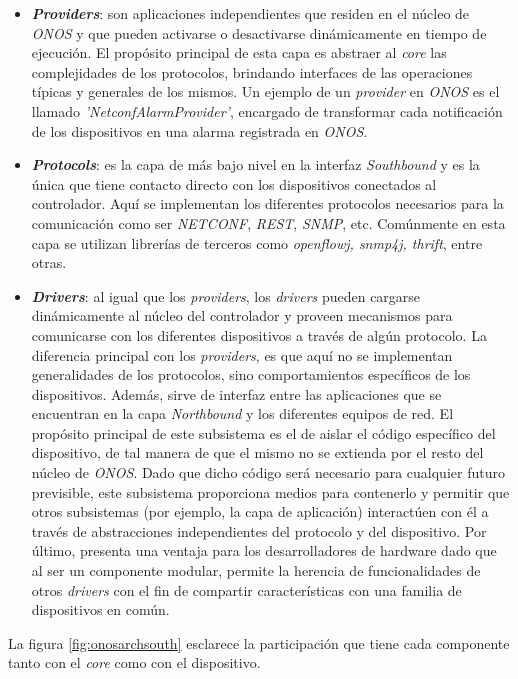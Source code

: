   \begin{itemize}
	\item \textbf{\textit{Providers}}: son aplicaciones independientes que residen en el núcleo de \textit{ONOS} y que pueden activarse o desactivarse dinámicamente en tiempo de ejecución. El propósito principal de esta capa es abstraer al \textit{core} las complejidades de los protocolos, brindando interfaces de las operaciones típicas y generales de los mismos. Un ejemplo de un \textit{provider} en \textit{ONOS} es el llamado \textit{'NetconfAlarmProvider'}, encargado de transformar cada notificación de los dispositivos en una alarma registrada en \textit{ONOS}.
	\item \textbf{\textit{Protocols}}: es la capa de más bajo nivel en la interfaz \textit{Southbound} y es la única que tiene contacto directo con los dispositivos conectados al controlador. Aquí se implementan los diferentes protocolos necesarios para la comunicación como ser \textit{NETCONF}, \textit{REST}, \textit{SNMP}, etc. Comúnmente en esta capa se utilizan librerías de terceros como \textit{openflowj, snmp4j, thrift}, entre otras.
	\item \textbf{\textit{Drivers}}: al igual que los \textit{providers}, los \textit{drivers} pueden cargarse dinámicamente al núcleo del controlador y proveen mecanismos para comunicarse con los diferentes dispositivos a través de algún protocolo. La diferencia principal con los \textit{providers}, es que aquí no se implementan generalidades de los protocolos, sino comportamientos específicos de los dispositivos. Además, sirve de interfaz entre las aplicaciones que se encuentran en la capa \textit{Northbound} y los diferentes equipos de red. El propósito principal de este subsistema es el de aislar el código específico del dispositivo, de tal manera de que el mismo no se extienda por el resto del núcleo de \textit{ONOS}. Dado que dicho código será necesario para cualquier futuro previsible, este subsistema proporciona medios para contenerlo y permitir que otros subsistemas (por ejemplo, la capa de aplicación) interactúen con él a través de abstracciones independientes del protocolo y del dispositivo. Por último, presenta una ventaja para los desarrolladores de hardware dado que al ser un componente modular, permite la herencia de funcionalidades de otros \textit{drivers} con el fin de compartir características con una familia de dispositivos en común.
\end{itemize}

La figura \ref{fig:onosarchsouth} esclarece la participación que tiene cada componente tanto con el \textit{core} como con el dispositivo.

